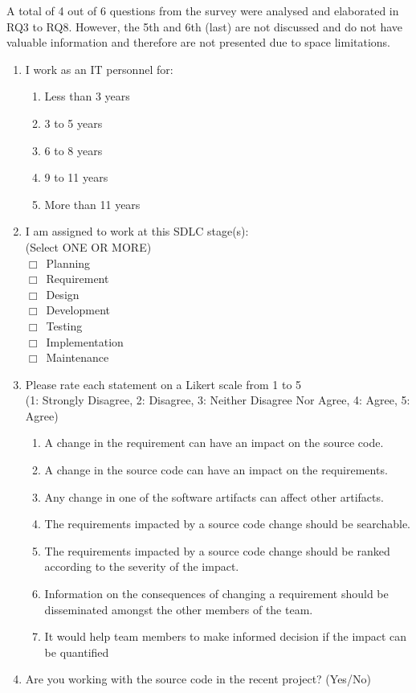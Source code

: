 \documentclass[conference]{IEEEtran}
\begin{document}
A total of 4 out of 6 questions from the survey were analysed and
elaborated in RQ3 to RQ8. However, the 5th and 6th (last) are not
discussed and do not have valuable information and therefore are not
presented due to space limitations.

\begin{enumerate}
\item I work as an IT personnel for:
  \begin{enumerate}
  \item Less than 3 years
  \item 3 to 5 years
  \item 6 to 8 years
  \item 9 to 11 years
  \item More than 11 years
  \end{enumerate}

\item I am assigned to work at this SDLC stage(s):\\
  (Select ONE OR MORE) \\
  $\Box$~Planning\\
  $\Box$~Requirement\\
  $\Box$~Design\\
  $\Box$~Development\\
  $\Box$~Testing\\
  $\Box$~Implementation\\
  $\Box$~Maintenance
\item Please rate each statement on a Likert scale from 1 to 5\\
 (1: Strongly Disagree, 2: Disagree, 3: Neither Disagree Nor Agree, 4:
 Agree, 5: Agree)
 \begin{enumerate}
 \item A change in the requirement can have an impact on the source code. 
 \item A change in the source code can have an impact on the requirements. 
 \item Any change in one of the software artifacts can affect other artifacts.
 \item The requirements impacted by a source code change should be searchable.
 \item The requirements impacted by a source code change should be ranked according to the severity of the impact.	
 \item Information on the consequences of changing a requirement should be disseminated amongst the other members of the team.
 \item It would help team members to make informed decision if the impact can be quantified
 \end{enumerate}

\item Are you working with the source code in the recent project? (Yes/No)
\end{enumerate}
\end{document}
